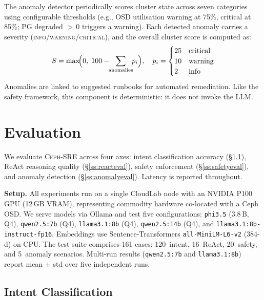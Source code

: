 \documentclass[sigplan,nonacm,10pt]{acmart}
\newcommand{\sysname}{\textsc{Ceph-SRE}\xspace}
\newcommand{\eg}{e.g.,\xspace}
\begin{document}
The anomaly detector periodically scores cluster state across
seven categories using configurable thresholds
(\eg OSD utilisation warning at 75\%, critical at 85\%;
PG degraded $>$\,0 triggers a warning).
Each detected anomaly carries a severity
(\textsc{info}/\textsc{warning}/\textsc{critical}), and the
overall cluster score is computed as:
\[
  S = \max\!\Bigl(0,\; 100 - \!\!\sum_{\text{anomalies}}\!\! p_i\Bigr),
  \quad
  p_i = \begin{cases}
    25 & \text{critical} \\
    10 & \text{warning} \\
    2  & \text{info}
  \end{cases}
\]
Anomalies are linked to suggested runbooks for automated
remediation.  Like the safety framework, this component is
deterministic: it does not invoke the LLM.


\section{Evaluation}\label{sec:eval}

We evaluate \sysname across four axes: intent classification
accuracy (\S\ref{ss:intent}), ReAct reasoning quality
(\S\ref{ss:reacteval}), safety enforcement (\S\ref{ss:safetyeval}),
and anomaly detection (\S\ref{ss:anomalyeval}).
Latency is reported throughout.

\smallskip\noindent\textbf{Setup.}\enspace
All experiments run on a single CloudLab node with an
NVIDIA P100 GPU (12\,GB VRAM), representing commodity hardware
co-located with a Ceph OSD\@.
We serve models via Ollama and test five configurations:
\texttt{phi3.5} (3.8\,B, Q4),
\texttt{qwen2.5:7b} (Q4),
\texttt{llama3.1:8b} (Q4),
\texttt{qwen2.5:14b} (Q4), and
\texttt{llama3.1:8b-instruct-fp16}.
Embeddings use Sentence-Transformers \texttt{all-MiniLM-L6-v2}
(384-d) on CPU\@.
The test suite comprises 161 cases: 120~intent, 16~ReAct,
20~safety, and 5~anomaly scenarios.
Multi-run results (\texttt{qwen2.5:7b} and \texttt{llama3.1:8b})
report mean $\pm$ std over five independent runs.

\subsection{Intent Classification}\label{ss:intent}
\end{document}
